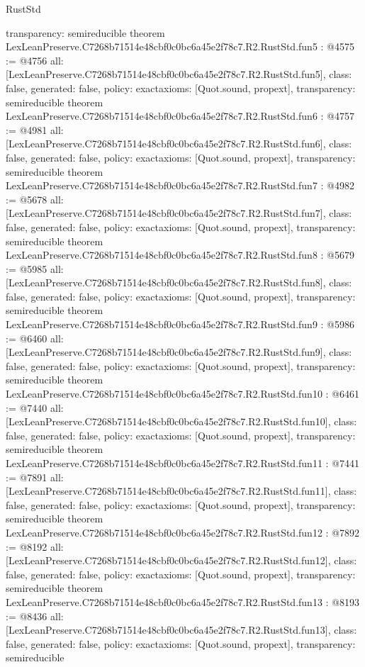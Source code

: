 \begin{lexlean}{RustStd}
\begin{coremodule}
{  transparency: semireducible
}
theorem LexLeanPreserve.C7268b71514e48cbf0c0bc6a45e2f78c7.R2.RustStd.fun5 : @4575 := @4756 {
  all: [LexLeanPreserve.C7268b71514e48cbf0c0bc6a45e2f78c7.R2.RustStd.fun5],
  class: false,
  generated: false,
  policy: exact{axioms: [Quot.sound, propext]},
  transparency: semireducible
}
theorem LexLeanPreserve.C7268b71514e48cbf0c0bc6a45e2f78c7.R2.RustStd.fun6 : @4757 := @4981 {
  all: [LexLeanPreserve.C7268b71514e48cbf0c0bc6a45e2f78c7.R2.RustStd.fun6],
  class: false,
  generated: false,
  policy: exact{axioms: [Quot.sound, propext]},
  transparency: semireducible
}
theorem LexLeanPreserve.C7268b71514e48cbf0c0bc6a45e2f78c7.R2.RustStd.fun7 : @4982 := @5678 {
  all: [LexLeanPreserve.C7268b71514e48cbf0c0bc6a45e2f78c7.R2.RustStd.fun7],
  class: false,
  generated: false,
  policy: exact{axioms: [Quot.sound, propext]},
  transparency: semireducible
}
theorem LexLeanPreserve.C7268b71514e48cbf0c0bc6a45e2f78c7.R2.RustStd.fun8 : @5679 := @5985 {
  all: [LexLeanPreserve.C7268b71514e48cbf0c0bc6a45e2f78c7.R2.RustStd.fun8],
  class: false,
  generated: false,
  policy: exact{axioms: [Quot.sound, propext]},
  transparency: semireducible
}
theorem LexLeanPreserve.C7268b71514e48cbf0c0bc6a45e2f78c7.R2.RustStd.fun9 : @5986 := @6460 {
  all: [LexLeanPreserve.C7268b71514e48cbf0c0bc6a45e2f78c7.R2.RustStd.fun9],
  class: false,
  generated: false,
  policy: exact{axioms: [Quot.sound, propext]},
  transparency: semireducible
}
theorem LexLeanPreserve.C7268b71514e48cbf0c0bc6a45e2f78c7.R2.RustStd.fun10 : @6461 := @7440 {
  all: [LexLeanPreserve.C7268b71514e48cbf0c0bc6a45e2f78c7.R2.RustStd.fun10],
  class: false,
  generated: false,
  policy: exact{axioms: [Quot.sound, propext]},
  transparency: semireducible
}
theorem LexLeanPreserve.C7268b71514e48cbf0c0bc6a45e2f78c7.R2.RustStd.fun11 : @7441 := @7891 {
  all: [LexLeanPreserve.C7268b71514e48cbf0c0bc6a45e2f78c7.R2.RustStd.fun11],
  class: false,
  generated: false,
  policy: exact{axioms: [Quot.sound, propext]},
  transparency: semireducible
}
theorem LexLeanPreserve.C7268b71514e48cbf0c0bc6a45e2f78c7.R2.RustStd.fun12 : @7892 := @8192 {
  all: [LexLeanPreserve.C7268b71514e48cbf0c0bc6a45e2f78c7.R2.RustStd.fun12],
  class: false,
  generated: false,
  policy: exact{axioms: [Quot.sound, propext]},
  transparency: semireducible
}
theorem LexLeanPreserve.C7268b71514e48cbf0c0bc6a45e2f78c7.R2.RustStd.fun13 : @8193 := @8436 {
  all: [LexLeanPreserve.C7268b71514e48cbf0c0bc6a45e2f78c7.R2.RustStd.fun13],
  class: false,
  generated: false,
  policy: exact{axioms: [Quot.sound, propext]},
  transparency: semireducible
}
\end{coremodule}
\end{lexlean}
